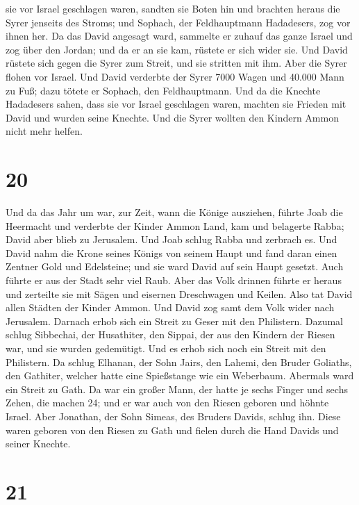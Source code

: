 sie vor Israel geschlagen waren, sandten sie Boten hin und brachten
heraus die Syrer jenseits des Stroms; und Sophach, der Feldhauptmann
Hadadesers, zog vor ihnen her.  Da das David angesagt
ward, sammelte er zuhauf das ganze Israel und zog über den Jordan; und
da er an sie kam, rüstete er sich wider sie. Und David rüstete sich
gegen die Syrer zum Streit, und sie stritten mit ihm. 
Aber die Syrer flohen vor Israel. Und David verderbte der Syrer 7000
Wagen und 40.000 Mann zu Fuß; dazu tötete er Sophach, den Feldhauptmann.
 Und da die Knechte Hadadesers sahen, dass sie vor Israel
geschlagen waren, machten sie Frieden mit David und wurden seine
Knechte. Und die Syrer wollten den Kindern Ammon nicht mehr helfen.

\hypertarget{section-19}{%
\section{20}\label{section-19}}

 Und da das Jahr um war, zur Zeit, wann die Könige
ausziehen, führte Joab die Heermacht und verderbte der Kinder Ammon
Land, kam und belagerte Rabba; David aber blieb zu Jerusalem. Und Joab
schlug Rabba und zerbrach es.  Und David nahm die Krone
seines Königs von seinem Haupt und fand daran einen Zentner Gold und
Edelsteine; und sie ward David auf sein Haupt gesetzt. Auch führte er
aus der Stadt sehr viel Raub.  Aber das Volk drinnen
führte er heraus und zerteilte sie mit Sägen und eisernen Dreschwagen
und Keilen. Also tat David allen Städten der Kinder Ammon. Und David zog
samt dem Volk wider nach Jerusalem.  Darnach erhob sich
ein Streit zu Geser mit den Philistern. Dazumal schlug Sibbechai, der
Husathiter, den Sippai, der aus den Kindern der Riesen war, und sie
wurden gedemütigt.  Und es erhob sich noch ein Streit mit
den Philistern. Da schlug Elhanan, der Sohn Jairs, den Lahemi, den
Bruder Goliaths, den Gathiter, welcher hatte eine Spießstange wie ein
Weberbaum.  Abermals ward ein Streit zu Gath. Da war ein
großer Mann, der hatte je sechs Finger und sechs Zehen, die machen 24;
und er war auch von den Riesen geboren  und höhnte Israel.
Aber Jonathan, der Sohn Simeas, des Bruders Davids, schlug ihn.
 Diese waren geboren von den Riesen zu Gath und fielen
durch die Hand Davids und seiner Knechte.

\hypertarget{section-20}{%
\section{21}\label{section-20}}

